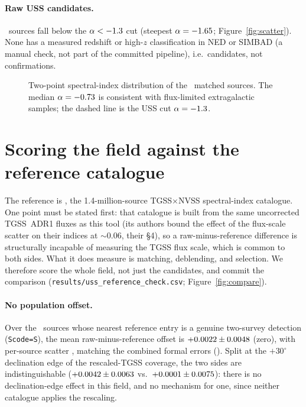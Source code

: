 \documentclass[twocolumn]{aastex631}
\newcommand{\code}[1]{\texttt{#1}}
\begin{document}
\paragraph{Raw USS candidates.} \usNuss\ sources fall below the $\alpha<-1.3$ cut (steepest
$\alpha=-1.65$; Figure~\ref{fig:scatter}). None has a measured redshift or high-$z$
classification in NED or SIMBAD (a manual check, not part of the committed pipeline), i.e.\
candidates, not confirmations.

\begin{figure}
\caption{Two-point spectral-index distribution of the \usNmatched\ matched sources. The median
$\alpha=-0.73$ is consistent with flux-limited extragalactic samples; the dashed line is
the USS cut $\alpha=-1.3$.}
\label{fig:hist}
\end{figure}

\section{Scoring the field against the reference catalogue}
The reference is \citet{degasperin2018}, the 1.4-million-source TGSS$\times$NVSS spectral-index
catalogue. One point must be stated first: that catalogue is built from the same uncorrected
TGSS~ADR1 fluxes as this tool (its authors bound the effect of the \citet{hurleywalker2017}
flux-scale scatter on their indices at $\sim$0.06, their \S4), so a raw-minus-reference
difference is structurally incapable of measuring the TGSS flux scale, which is common to both
sides. What it does measure is matching, deblending, and selection. We therefore score the
whole field, not just the candidates, and commit the comparison
(\code{results/uss\_reference\_check.csv}; Figure~\ref{fig:compare}).

\paragraph{No population offset.} Over the \usRealNPairs\ sources whose nearest reference entry is
a genuine two-survey detection (\code{Scode=S}), the mean raw-minus-reference offset is
$+0.0022\pm0.0048$ (zero), with per-source scatter \usRealScatter,
matching the combined formal errors (\usRealScatterExp). Split at the $+30^\circ$ declination edge
of the rescaled-TGSS coverage, the two sides are indistinguishable
($+0.0042\pm0.0063$ vs.\ $+0.0001\pm0.0075$): there is no
declination-edge effect in this field, and no mechanism for one, since neither catalogue applies
the rescaling.
\end{document}
